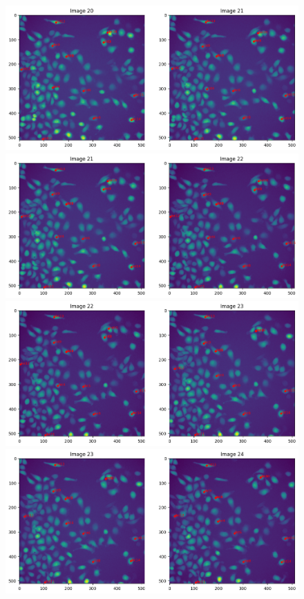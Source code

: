 \documentclass{article}
\begin{document}
\begin{figure}[h!]
\centering
\includegraphics[width=0.75\linewidth]{Report/RImages/Traces_Control/image_21a.png}
\includegraphics[width=0.75\linewidth]
{Report/RImages/Traces_Control/image_22a.png}
\includegraphics[width=0.75\linewidth]{Report/RImages/Traces_Control/image_23a.png}
\includegraphics[width=0.75\linewidth]{Report/RImages/Traces_Control/image_24a.png}
\end{figure}
\end{document}
